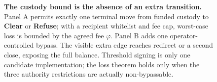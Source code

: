 \begin{figure}[H]
{}
\caption{\textbf{The custody bound is the absence of an extra transition.}
Panel A permits exactly one terminal move from funded custody to \textbf{Clear}
or \textbf{Refuse}; with a recipient whitelist and fee cap, worst-case loss is
bounded by the agreed fee $\varphi$. Panel B adds one operator-controlled bypass.
The visible extra edge reaches redirect or a second close, exposing the full
balance. Threshold signing is only one candidate implementation; the loss theorem
holds only when the three authority restrictions are actually non-bypassable.}
\label{fig:fh-settlement}
\end{figure}
